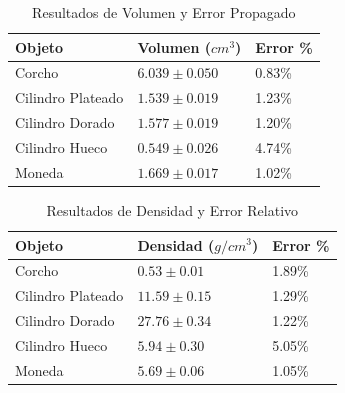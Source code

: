 
\begin{table}[h!]
    \centering
    \caption{Resultados de Volumen y Error Propagado}
    \label{tab:res_vol}
    \begin{tabular}{lll}
    \toprule
    \toprule
    \midrule
    Objeto & Volumen ($cm^3$) & Error \% \\
    \midrule
    Corcho & $6.039 \pm 0.050$ & 0.83\% \\
    Cilindro Plateado & $1.539 \pm 0.019$ & 1.23\% \\
    Cilindro Dorado & $1.577 \pm 0.019$ & 1.20\% \\
    Cilindro Hueco & $0.549 \pm 0.026$ & 4.74\% \\
    Moneda & $1.669 \pm 0.017$ & 1.02\% \\
    \bottomrule
    \bottomrule
    \end{tabular}
\end{table}

\begin{table}[h!]
    \centering
    \caption{Resultados de Densidad y Error Relativo}
    \label{tab:res_den}
    \begin{tabular}{lll}
    \toprule
    \toprule
    \midrule
    Objeto & Densidad ($g/cm^3$) & Error \% \\
    \midrule
    Corcho & $0.53 \pm 0.01$ & 1.89\% \\
    Cilindro Plateado & $11.59 \pm 0.15$ & 1.29\% \\
    Cilindro Dorado & $27.76 \pm 0.34$ & 1.22\% \\
    Cilindro Hueco & $5.94 \pm 0.30$ & 5.05\% \\
    Moneda & $5.69 \pm 0.06$ & 1.05\% \\
    \bottomrule
    \bottomrule
    \end{tabular}
\end{table}
